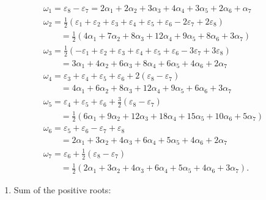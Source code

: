 \[
\begin{array}{l} \omega_ {1} = \varepsilon_ {8} - \varepsilon_ {7} = 2 \alpha_ {1} + 2 \alpha_ {2} + 3 \alpha_ {3} + 4 \alpha_ {4} + 3 \alpha_ {5} + 2 \alpha_ {6} + \alpha_ {7} \\ \omega_ {2} = \frac {1}{2} (\varepsilon_ {1} + \varepsilon_ {2} + \varepsilon_ {3} + \varepsilon_ {4} + \varepsilon_ {5} + \varepsilon_ {6} - 2 \varepsilon_ {7} + 2 \varepsilon_ {8}) \\ \qquad = \frac {1}{2} (4 \alpha_ {1} + 7 \alpha_ {2} + 8 \alpha_ {3} + 12 \alpha_ {4} + 9 \alpha_ {5} + 8 \alpha_ {6} + 3 \alpha_ {7}) \\ \omega_ {3} = \frac {1}{2} (- \varepsilon_ {1} + \varepsilon_ {2} + \varepsilon_ {3} + \varepsilon_ {4} + \varepsilon_ {5} + \varepsilon_ {6} - 3 \varepsilon_ {7} + 3 \varepsilon_ {8}) \\ \qquad = 3 \alpha_ {1} + 4 \alpha_ {2} + 6 \alpha_ {3} + 8 \alpha_ {4} + 6 \alpha_ {5} + 4 \alpha_ {6} + 2 \alpha_ {7} \\ \omega_ {4} = \varepsilon_ {3} + \varepsilon_ {4} + \varepsilon_ {5} + \varepsilon_ {6} + 2 (\varepsilon_ {8} - \varepsilon_ {7}) \\ \qquad = 4 \alpha_ {1} + 6 \alpha_ {2} + 8 \alpha_ {3} + 12 \alpha_ {4} + 9 \alpha_ {5} + 6 \alpha_ {6} + 3 \alpha_ {7} \\ \omega_ {5} = \varepsilon_ {4} + \varepsilon_ {5} + \varepsilon_ {6} + \frac {3}{2} (\varepsilon_ {8} - \varepsilon_ {7}) \\ \qquad = \frac {1}{2} (6 \alpha_ {1} + 9 \alpha_ {2} + 12 \alpha_ {3} + 18 \alpha_ {4} + 15 \alpha_ {5} + 10 \alpha_ {6} + 5 \alpha_ {7}) \\ \omega_ {6} = \varepsilon_ {5} + \varepsilon_ {6} - \varepsilon_ {7} + \varepsilon_ {8} \\ \qquad = 2 \alpha_ {1} + 3 \alpha_ {2} + 4 \alpha_ {3} + 6 \alpha_ {4} + 5 \alpha_ {5} + 4 \alpha_ {6} + 2 \alpha_ {7} \\ \omega_ {7} = \varepsilon_ {6} + \frac {1}{2} (\varepsilon_ {8} - \varepsilon_ {7}) \\ \qquad = \frac {1}{2} (2 \alpha_ {1} + 3 \alpha_ {2} + 4 \alpha_ {3} + 6 \alpha_ {4} + 5 \alpha_ {5} + 4 \alpha_ {6} + 3 \alpha_ {7}). \end{array}
\]

\begin{enumerate}
\def\labelenumi{(\Roman{enumi})}
\setcounter{enumi}{6}
\tightlist
\item
  Sum of the positive roots:
\end{enumerate}

